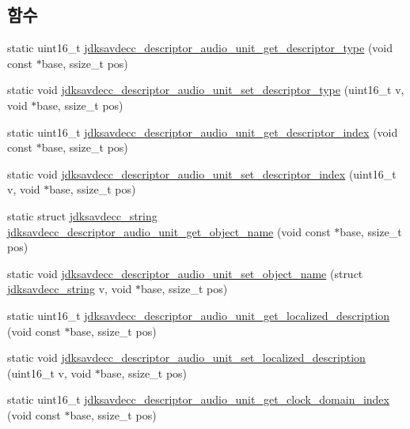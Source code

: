 \subsection*{함수}
\begin{DoxyCompactItemize}
\item 
static uint16\+\_\+t \hyperlink{group__descriptor__audio_gad4b7e68dd3406168dbae73a3544a75ee}{jdksavdecc\+\_\+descriptor\+\_\+audio\+\_\+unit\+\_\+get\+\_\+descriptor\+\_\+type} (void const $\ast$base, ssize\+\_\+t pos)
\item 
static void \hyperlink{group__descriptor__audio_ga134984b598380da96c445773b0c39019}{jdksavdecc\+\_\+descriptor\+\_\+audio\+\_\+unit\+\_\+set\+\_\+descriptor\+\_\+type} (uint16\+\_\+t v, void $\ast$base, ssize\+\_\+t pos)
\item 
static uint16\+\_\+t \hyperlink{group__descriptor__audio_gaa38833b7503f98f35a7047d138c55d63}{jdksavdecc\+\_\+descriptor\+\_\+audio\+\_\+unit\+\_\+get\+\_\+descriptor\+\_\+index} (void const $\ast$base, ssize\+\_\+t pos)
\item 
static void \hyperlink{group__descriptor__audio_ga5a7f323e9bf127c012a9d364ac6aac7b}{jdksavdecc\+\_\+descriptor\+\_\+audio\+\_\+unit\+\_\+set\+\_\+descriptor\+\_\+index} (uint16\+\_\+t v, void $\ast$base, ssize\+\_\+t pos)
\item 
static struct \hyperlink{structjdksavdecc__string}{jdksavdecc\+\_\+string} \hyperlink{group__descriptor__audio_ga76bbf6a2c3634646b50a8987dafb5f96}{jdksavdecc\+\_\+descriptor\+\_\+audio\+\_\+unit\+\_\+get\+\_\+object\+\_\+name} (void const $\ast$base, ssize\+\_\+t pos)
\item 
static void \hyperlink{group__descriptor__audio_gac43ee79ece4d4189fe20bc595152aa0a}{jdksavdecc\+\_\+descriptor\+\_\+audio\+\_\+unit\+\_\+set\+\_\+object\+\_\+name} (struct \hyperlink{structjdksavdecc__string}{jdksavdecc\+\_\+string} v, void $\ast$base, ssize\+\_\+t pos)
\item 
static uint16\+\_\+t \hyperlink{group__descriptor__audio_gaac4d24b626fb7665f8ebf4d98181b09c}{jdksavdecc\+\_\+descriptor\+\_\+audio\+\_\+unit\+\_\+get\+\_\+localized\+\_\+description} (void const $\ast$base, ssize\+\_\+t pos)
\item 
static void \hyperlink{group__descriptor__audio_ga4b5dae705b5360c134eaf2214fdb27d9}{jdksavdecc\+\_\+descriptor\+\_\+audio\+\_\+unit\+\_\+set\+\_\+localized\+\_\+description} (uint16\+\_\+t v, void $\ast$base, ssize\+\_\+t pos)
\item 
static uint16\+\_\+t \hyperlink{group__descriptor__audio_ga2ae8a985361ba0fbe5c0ab4db5668ce8}{jdksavdecc\+\_\+descriptor\+\_\+audio\+\_\+unit\+\_\+get\+\_\+clock\+\_\+domain\+\_\+index} (void const $\ast$base, ssize\+\_\+t pos)

\end{DoxyCompactItemize}
